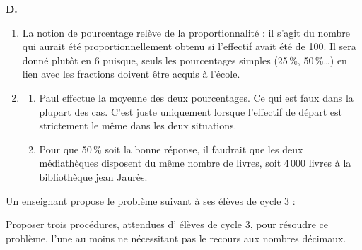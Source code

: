 \begin{corrige}
{\bf D.} 
\begin{enumerate}
   \item La notion de pourcentage relève de la proportionnalité : il s'agit du nombre qui aurait été proportionnellement obtenu si l'effectif avait été de 100. Il sera donné plutôt en 6 puisque, seuls les pourcentages simples (25\,\%, 50\,\%\dots) en lien avec les fractions doivent être acquis à l'école.
   \item
   \begin{enumerate}
      \item Paul effectue la moyenne des deux pourcentages. Ce qui est faux dans la plupart des cas. C'est juste uniquement lorsque l'effectif de départ est strictement le même dans les deux situations.
      \item Pour que 50\,\% soit la bonne réponse, il faudrait que les deux médiathèques disposent du même nombre de livres, soit 4\,000 livres à la bibliothèque jean Jaurès.
   \end{enumerate}
\end{enumerate}
\end{corrige}

\bigskip

\begin{exercice}[CRPE 2016 G2]
Un enseignant propose le problème suivant à ses élèves de cycle 3 :
\begin{center}
\end{center}
Proposer trois procédures, attendues d' élèves de cycle 3, pour résoudre ce problème, l'une au moins ne nécessitant pas le recours aux nombres décimaux.
\end{exercice}

